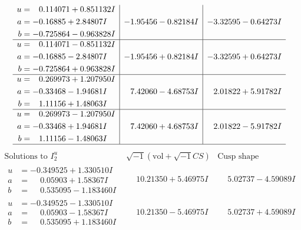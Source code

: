 \documentclass[1p]{elsarticle_modified}
\theoremstyle{definition}
\newcommand{\I}{\sqrt{-1}}
\begin{document}
$$\begin{array}{c|c|c}
\begin{aligned}
u &= \phantom{-}0.114071 + 0.851132 I \\
a &= -0.16885 + 2.84807 I \\
b &= -0.725864 - 0.963828 I\end{aligned}
 & -1.95456 - 0.82184 I & -3.32595 - 0.64273 I \\ \hline\begin{aligned}
u &= \phantom{-}0.114071 - 0.851132 I \\
a &= -0.16885 - 2.84807 I \\
b &= -0.725864 + 0.963828 I\end{aligned}
 & -1.95456 + 0.82184 I & -3.32595 + 0.64273 I \\ \hline\begin{aligned}
u &= \phantom{-}0.269973 + 1.207950 I \\
a &= -0.33468 - 1.94681 I \\
b &= \phantom{-}1.11156 + 1.48063 I\end{aligned}
 & \phantom{-}7.42060 - 4.68753 I & \phantom{-}2.01822 + 5.91782 I \\ \hline\begin{aligned}
u &= \phantom{-}0.269973 - 1.207950 I \\
a &= -0.33468 + 1.94681 I \\
b &= \phantom{-}1.11156 - 1.48063 I\end{aligned}
 & \phantom{-}7.42060 + 4.68753 I & \phantom{-}2.01822 - 5.91782 I\\
 \hline 
 \end{array}$$\newpage$$\begin{array}{c|c|c}  
\text{Solutions to }I^u_{2}& \I (\text{vol} + \sqrt{-1}CS) & \text{Cusp shape}\\
 \hline 
\begin{aligned}
u &= -0.349525 + 1.330510 I \\
a &= \phantom{-}0.05903 + 1.58367 I \\
b &= \phantom{-}0.535095 - 1.183460 I\end{aligned}
 & \phantom{-}10.21350 + 5.46975 I & \phantom{-}5.02737 - 4.59089 I \\ \hline\begin{aligned}
u &= -0.349525 - 1.330510 I \\
a &= \phantom{-}0.05903 - 1.58367 I \\
b &= \phantom{-}0.535095 + 1.183460 I\end{aligned}
 & \phantom{-}10.21350 - 5.46975 I & \phantom{-}5.02737 + 4.59089 I \\ \hline\begin{aligned}

\end{aligned}
\end{array}$$
\end{document}
